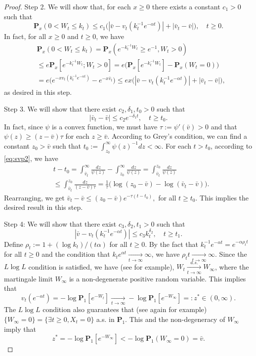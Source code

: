 \documentclass[12pt,a4paper]{amsart}
\theoremstyle{plain}
\theoremstyle{definition}
\numberwithin{equation}{section}
\begin{document}
\begin{proof}
  Step 2. We will show that, for each $x \geq 0$ there exists a constant $c_1>0$ such that
  \[
    \mathbf P_{x}(0< W_t\leq k_t)
    \leq c_1\big(|\bar v- v_t(k_t^{-1}e^{-\alpha t})|+|\bar v_t - \bar v|\big),
    \quad t\geq 0.
  \]
  In fact, for all $x\geq 0$ and $t\geq 0$, we have
  \begin{align}
    & \mathbf P_{x}(0<W_t \leq k_t)
      = \mathbf P_{x}( e^{-k_t^{-1}W_t}\geq e^{-1},W_t > 0) \\
    & \leq e \mathbf P_{x}[e^{-k_t^{-1} W_t};W_t > 0]
      =  e\big(\mathbf P_x[e^{-k_t^{-1} W_t}]-\mathbf P_x(W_t = 0)\big) \\
    & = e\big(e^{-xv_t(k_t^{-1} e^{-\alpha t})}-e^{-x\bar v_t}\big)
      \leq ex \big(|\bar v-v_t(k_t^{-1} e^{-\alpha t})|+ |\bar v_t- \bar v|\big),
  \end{align}
  as desired in this step.

  Step 3. We will show that there exist $c_2, \delta_1, t_0 > 0$ such that
  \[
    |\bar v_t-\bar v|
    \leq c_2e^{-\delta_1 t}
    , \quad t\geq t_0.
  \]
  In fact, since $\psi$ is a convex function, we must have $\tau:=\psi'(\bar v)>0$ and that  $\psi(z) \geq (z-\bar v)\tau$ for each $z\geq \bar v$.
  According to Grey's condition, we can find a constant $z_0 >\bar v $ such that $t_0 := \int^\infty_{z_0}\psi(z)^{-1}dz<\infty$.
  For each $t > t_0$, according to \eqref{eq:svp2}, we have
  \begin{align}
    & t - t_0 =
      \int^\infty_{\bar v_t} \frac{dz}{\psi(z)} - \int_{z_0}^\infty \frac{dz}{\psi(z)}
      = \int_{\bar v_t}^{z_0} \frac{dz}{\psi(z)} \\
    & \leq \int_{\bar v_t}^{z_0} \frac{dz}{(z-\bar v)\tau}
      = \frac{1}{\tau} \big(\log (z_0-\bar v) - \log(\bar v_t-\bar v)\big).
  \end{align}
  Rearranging, we get $ \bar v_t - \bar v \leq (z_0 - \bar v)e^{-\tau(t-t_0)}, $ for all $t\geq t_0$.
  This implies the desired result in this step.

  Step 4:
  We will show that there exist $c_3, \delta_2, t_1>0$ such that
  \[
    |\bar v - v_t(k_t^{-1} e^{-\alpha t})|\leq
    c_3k_t^{\delta_2}, \quad t\geq t_1.
  \]
  Define $\rho_t := 1+(\log k_t)/(t\alpha)$ for all $t\geq 0$.
  By the fact that $k_t^{-1}e^{-\alpha t} = e^{-\alpha \rho_t t}$ for  all $t\geq 0$ and the condition that $k_t e^{\alpha t} \xrightarrow[t\to \infty]{} \infty$, we have $\rho_t t \xrightarrow[t\to \infty]{} \infty $.
  Since the $L\log L$ condition is satisfied, we have (see \cite{LiuRenSong2009Llog} for example), $W_t \xrightarrow[t\to \infty]{a.s.} W_\infty$, where the martingale limit $W_\infty$ is a non-degenerate positive random variable. This implies that
\[
  v_t(e^{-\alpha t})
  = -\log \mathbf P_1[e^{-W_t}]\xrightarrow[t\to \infty]{} - \log \mathbf P_{1}[e^{-W_\infty}]
  =: z^* \in (0,\infty).
\]
The $L \log L$ condition also guarantees that (see again \cite{LiuRenSong2009Llog} for example) $\{W_\infty = 0\} = \{\exists t \geq 0, X_t= 0\}$  a.s. in $\mathbf P_1$. This and the non-degeneracy of $W_\infty$ imply that
\[
  z^*
  = -\log \mathbf P_1[e^{-W_\infty}]
  < -\log \mathbf P_1(W_\infty = 0) = \bar v.
\]


\end{proof}
\end{document}
